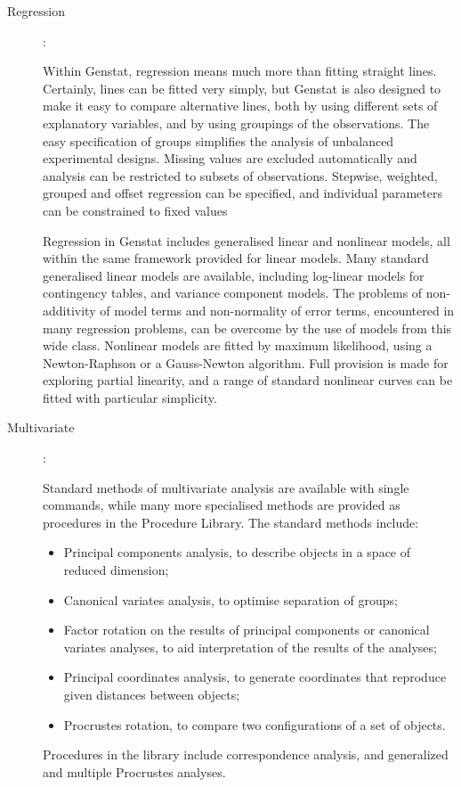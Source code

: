 \begin{description}

\item [Regression]:

Within Genstat, regression means much more than fitting straight lines.
Certainly, lines can be fitted very simply, but Genstat is also
designed to make it easy to compare alternative lines, both by using
different sets of explanatory variables, and by using groupings of the
observations.
The easy specification of groups simplifies the analysis of unbalanced
experimental designs.
Missing values are excluded automatically and analysis can be restricted
to subsets of observations.
Stepwise, weighted, grouped and offset regression can be specified, and
individual parameters can be constrained to fixed values

Regression in Genstat includes generalised linear and nonlinear models,
all within the same framework provided for linear models.
Many standard generalised linear models are available, including log-linear
models for contingency tables, and variance component models.
The problems of non-additivity of model terms and non-normality of error
terms, encountered in many regression problems, can be overcome by the use
of models from this wide class.
Nonlinear models are fitted by maximum likelihood, using a Newton-Raphson
or a Gauss-Newton algorithm.
Full provision is made for exploring partial linearity, and a range of
standard nonlinear curves can be fitted with particular simplicity.

\item [Multivariate]:

Standard methods of multivariate analysis are available with single commands,
while many more specialised methods are provided as procedures in the
Procedure Library.
The standard methods include:
\begin{itemize}
\item Principal components analysis, to describe objects in a space of reduced
dimension;
\item Canonical variates analysis, to optimise separation of groups;
\item Factor rotation on the results of principal components or canonical
variates analyses, to aid interpretation of the results of the analyses;
\item Principal coordinates analysis, to generate coordinates that reproduce
given distances between objects;
\item Procrustes rotation, to compare two configurations of a set of objects.
\end{itemize}
Procedures in the library include correspondence analysis, and generalized
and multiple Procrustes analyses.


\end{description}
